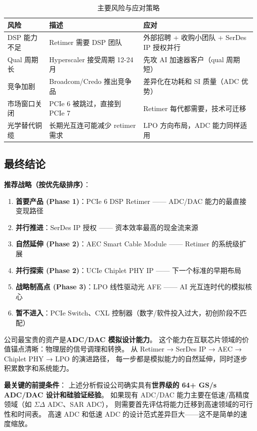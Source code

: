 \documentclass[11pt,a4paper]{ctexart}
\begin{document}
\begin{table}[htb]
    \centering
    \caption{主要风险与应对策略}
    \label{tab:risk-mitigation}
    \begin{tabular}{lp{}p{}}
        \toprule
        \textbf{风险} & \textbf{描述} & \textbf{应对} \\
        \midrule
        DSP 能力不足 & Retimer 需要 DSP 团队 & 外部招聘 + 收购小团队 + SerDes IP 授权并行 \\
        Qual 周期长 & Hyperscaler 接受周期 12-24 月 & 先攻 AI 加速器客户（qual 周期短） \\
        竞争加剧 & Broadcom/Credo 推出竞争品 & 差异化在功耗和 SI 质量（ADC 优势） \\
        市场窗口关闭 & PCIe 6 被跳过，直接到 PCIe 7 & Retimer 每代都需要，技术可迁移 \\
        光学替代铜缆 & 长期光互连可能减少 retimer 需求 & LPO 方向布局，ADC 能力同样适用 \\
        \bottomrule
    \end{tabular}
\end{table}

\subsection{最终结论}

\begin{recommendation}
    \textbf{推荐战略（按优先级排序）}：

    \begin{enumerate}
        \item \textbf{首要产品 (Phase 1)}：PCIe 6 DSP Retimer —— ADC/DAC 能力的最直接变现路径
        \item \textbf{并行推进}：SerDes IP 授权 —— 资本效率最高的现金流来源
        \item \textbf{自然延伸 (Phase 2)}：AEC Smart Cable Module —— Retimer 的系统级扩展
        \item \textbf{并行探索 (Phase 2)}：UCIe Chiplet PHY IP —— 下一个标准的早期布局
        \item \textbf{战略制高点 (Phase 3)}：LPO 线性驱动光 AFE —— AI 光互连时代的模拟核心
        \item \textbf{暂不进入}：PCIe Switch、CXL 控制器（数字/软件投入过大，初创阶段不匹配）
    \end{enumerate}

    公司最宝贵的资产是\textbf{ADC/DAC 模拟设计能力}。
    这个能力在互联芯片领域的价值锚点清晰：物理层的信号调理和转换。
    从 Retimer → SerDes IP → AEC → Chiplet PHY → LPO 的演进路径，
    每一步都是模拟能力的自然延伸，同时逐步积累数字和系统能力。
\end{recommendation}

\vspace{0.3cm}

\begin{warningbox}
    \textbf{最关键的前提条件}：
    上述分析假设公司确实具有\textbf{世界级的 64+ GS/s ADC/DAC 设计和硅验证经验}。
    如果现有 ADC/DAC 能力主要在低速/高精度领域（如 $\Sigma\Delta$ ADC、SAR ADC），
    则需要首先评估将能力迁移到高速领域的可行性和时间表。
    高速 ADC 和低速 ADC 的设计范式差异巨大——这不是简单的速度缩放。
\end{warningbox}
\end{document}
